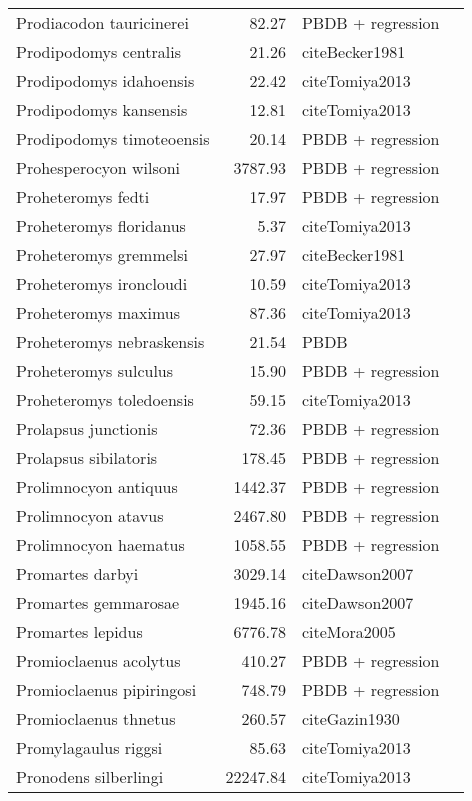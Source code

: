 \begin{table}[ht]
\begin{tabular}{lrll}
  Prodiacodon tauricinerei & 82.27 & PBDB + regression &  \\ 
  Prodipodomys centralis & 21.26 & cite{Becker1981} &  \\ 
  Prodipodomys idahoensis & 22.42 & cite{Tomiya2013} &  \\ 
  Prodipodomys kansensis & 12.81 & cite{Tomiya2013} &  \\ 
  Prodipodomys timoteoensis & 20.14 & PBDB + regression &  \\ 
  Prohesperocyon wilsoni & 3787.93 & PBDB + regression &  \\ 
  Proheteromys fedti & 17.97 & PBDB + regression &  \\ 
  Proheteromys floridanus & 5.37 & cite{Tomiya2013} &  \\ 
  Proheteromys gremmelsi & 27.97 & cite{Becker1981} &  \\ 
  Proheteromys ironcloudi & 10.59 & cite{Tomiya2013} &  \\ 
  Proheteromys maximus & 87.36 & cite{Tomiya2013} &  \\ 
  Proheteromys nebraskensis & 21.54 & PBDB &  \\ 
  Proheteromys sulculus & 15.90 & PBDB + regression &  \\ 
  Proheteromys toledoensis & 59.15 & cite{Tomiya2013} &  \\ 
  Prolapsus junctionis & 72.36 & PBDB + regression &  \\ 
  Prolapsus sibilatoris & 178.45 & PBDB + regression &  \\ 
  Prolimnocyon antiquus & 1442.37 & PBDB + regression &  \\ 
  Prolimnocyon atavus & 2467.80 & PBDB + regression &  \\ 
  Prolimnocyon haematus & 1058.55 & PBDB + regression &  \\ 
  Promartes darbyi & 3029.14 & cite{Dawson2007} &  \\ 
  Promartes gemmarosae & 1945.16 & cite{Dawson2007} &  \\ 
  Promartes lepidus & 6776.78 & cite{Mora2005} &  \\ 
  Promioclaenus acolytus & 410.27 & PBDB + regression &  \\ 
  Promioclaenus pipiringosi & 748.79 & PBDB + regression &  \\ 
  Promioclaenus thnetus & 260.57 & cite{Gazin1930} &  \\ 
  Promylagaulus riggsi & 85.63 & cite{Tomiya2013} &  \\ 
  Pronodens silberlingi & 22247.84 & cite{Tomiya2013} &  \\ 

\end{tabular}
\end{table}
